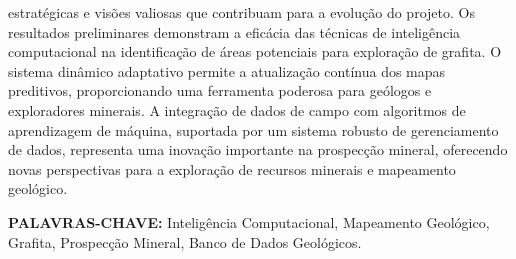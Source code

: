 \documentclass{article}
\begin{document}
{estratégicas e visões valiosas que contribuam para a evolução do projeto. Os resultados preliminares demonstram a eficácia das técnicas de inteligência computacional na identificação de áreas potenciais para exploração de grafita. O sistema dinâmico adaptativo permite a atualização contínua dos mapas preditivos, proporcionando uma ferramenta poderosa para geólogos e exploradores minerais. A integração de dados de campo com algoritmos de aprendizagem de máquina, suportada por um sistema robusto de gerenciamento de dados, representa uma inovação importante na prospecção mineral, oferecendo novas perspectivas para a exploração de recursos minerais e mapeamento geológico.
}
\par{
    \fontsize{12}{14}\textbf{\uppercase{PALAVRAS-CHAVE:}} Inteligência Computacional, Mapeamento Geológico, Grafita, Prospecção Mineral, Banco de Dados Geológicos.
}
\end{document}
